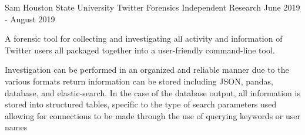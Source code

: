 \begin{cventries}
    \cventry
      {Sam Houston State University} %
      {Twitter Forensics} %
	  {Independent Research} %
      {June 2019 - August 2019} %
      {
        \begin{cvitems} %
          \item {A forensic tool for collecting and investigating all activity and information of Twitter users all packaged together into a user-friendly command-line tool.}
          \item {Investigation can be performed in an organized and reliable manner due to the various formats return information can be stored including JSON, pandas, database, and elastic-search. In the case of the database output, all information is stored into structured tables, specific to the type of search parameters used allowing for connections to be made through the use of querying keywords or user names}
       \end{cvitems}
      }

\end{cventries}
